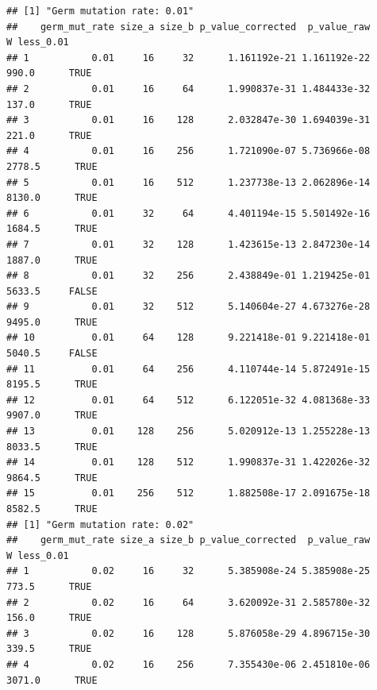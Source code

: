 \documentclass[]{book}
\newenvironment{Shaded}{\begin{snugshade}}{\end{snugshade}}
\newcommand{\DataTypeTok}[1]{\textcolor[rgb]{0.13,0.29,0.53}{#1}}
\newcommand{\FloatTok}[1]{\textcolor[rgb]{0.00,0.00,0.81}{#1}}
\newcommand{\KeywordTok}[1]{\textcolor[rgb]{0.13,0.29,0.53}{\textbf{#1}}}
\newcommand{\NormalTok}[1]{#1}
\newcommand{\OperatorTok}[1]{\textcolor[rgb]{0.81,0.36,0.00}{\textbf{#1}}}
\newcommand{\StringTok}[1]{\textcolor[rgb]{0.31,0.60,0.02}{#1}}
\begin{document}
\begin{Shaded}
\end{Shaded}

\begin{verbatim}
## [1] "Germ mutation rate: 0.01"
##    germ_mut_rate size_a size_b p_value_corrected  p_value_raw      W less_0.01
## 1           0.01     16     32      1.161192e-21 1.161192e-22  990.0      TRUE
## 2           0.01     16     64      1.990837e-31 1.484433e-32  137.0      TRUE
## 3           0.01     16    128      2.032847e-30 1.694039e-31  221.0      TRUE
## 4           0.01     16    256      1.721090e-07 5.736966e-08 2778.5      TRUE
## 5           0.01     16    512      1.237738e-13 2.062896e-14 8130.0      TRUE
## 6           0.01     32     64      4.401194e-15 5.501492e-16 1684.5      TRUE
## 7           0.01     32    128      1.423615e-13 2.847230e-14 1887.0      TRUE
## 8           0.01     32    256      2.438849e-01 1.219425e-01 5633.5     FALSE
## 9           0.01     32    512      5.140604e-27 4.673276e-28 9495.0      TRUE
## 10          0.01     64    128      9.221418e-01 9.221418e-01 5040.5     FALSE
## 11          0.01     64    256      4.110744e-14 5.872491e-15 8195.5      TRUE
## 12          0.01     64    512      6.122051e-32 4.081368e-33 9907.0      TRUE
## 13          0.01    128    256      5.020912e-13 1.255228e-13 8033.5      TRUE
## 14          0.01    128    512      1.990837e-31 1.422026e-32 9864.5      TRUE
## 15          0.01    256    512      1.882508e-17 2.091675e-18 8582.5      TRUE
## [1] "Germ mutation rate: 0.02"
##    germ_mut_rate size_a size_b p_value_corrected  p_value_raw      W less_0.01
## 1           0.02     16     32      5.385908e-24 5.385908e-25  773.5      TRUE
## 2           0.02     16     64      3.620092e-31 2.585780e-32  156.0      TRUE
## 3           0.02     16    128      5.876058e-29 4.896715e-30  339.5      TRUE
## 4           0.02     16    256      7.355430e-06 2.451810e-06 3071.0      TRUE

\end{verbatim}
\end{document}
